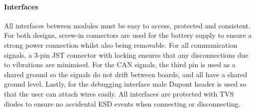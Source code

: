 \paragraph{Interfaces}
All interfaces between modules must be easy to access, protected and consistent. For both designs, screw-in connectors are used for the battery supply to ensure a strong power connection whilst also being removable. For all communication signals, a 3-pin JST connector with locking ensures that any disconnections due to vibrations are minimised. For the \gls{CAN} signals, the third pin is used as a shared ground so the signals do not drift between boards, and all have a shared ground level. Lastly, for the debugging interface male Dupont header is used so that the user can attach wires easily. All interfaces are protected with \gls{TVS} diodes to ensure no accidental \gls{ESD} events when connecting or disconnecting.


\begin{comment}
\subsubsection{Component Placement}\label{sub_sub_section:tgt_component_placement}

\paragraph{Thermal Considerations}
Heat dissipating elements, typically diodes and resistors, can cause damage to electronic components, therefore, heat sinks or controlled airflows are sometimes required. This consideration is why on my devices Buck Converters of above 90\% are used instead of the less efficient \gls{LDO}, which would have an efficiency of 66\% when converting from 5V to 3.3V. This, in addition to the low power draws of all other components, means that no explicit thermal management is needed.
\end{comment}